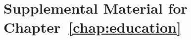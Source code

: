\chapter{Supplemental Material for Chapter~\ref{chap:education}}
\label{chap:education-sup}
\clearpage


